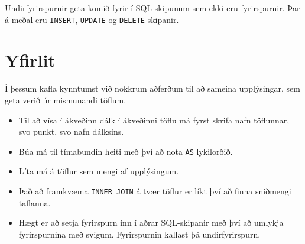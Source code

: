 Undirfyrirspurnir geta komið fyrir í SQL-skipunum sem ekki eru fyrirspurnir. Þar á meðal eru \verb|INSERT|, \verb|UPDATE| og \verb|DELETE| skipanir.

\section{Yfirlit}
Í þessum kafla kynntumst við nokkrum aðferðum til að sameina upplýsingar, sem geta verið úr mismunandi töflum.
\begin{itemize}
 \item Til að vísa í ákveðinn dálk í ákveðinni töflu má fyrst skrifa nafn töflunnar, svo punkt, svo nafn dálksins.
 \item Búa má til tímabundin heiti með því að nota \verb|AS| lykilorðið.
 \item Líta má á töflur sem mengi af upplýsingum.
 \item Það að framkvæma \verb|INNER JOIN| á tvær töflur er líkt því að finna sniðmengi taflanna.
 \item Hægt er að setja fyrirspurn inn í aðrar SQL-skipanir með því að umlykja fyrirspurnina með svigum. Fyrirspurnin kallast þá undirfyrirspurn.
\end{itemize}

